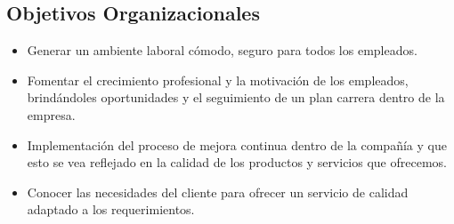 \subsection{Objetivos Organizacionales}
\begin{itemize}
\item Generar un ambiente laboral cómodo, seguro para todos los empleados.
\item Fomentar el crecimiento profesional y la motivación de los empleados, brindándoles oportunidades y el seguimiento de un plan carrera dentro de la empresa. 
\item Implementación del proceso de mejora continua dentro de la compañía y que esto se vea reflejado en la calidad de los productos y servicios que ofrecemos.
\item Conocer las necesidades del cliente para ofrecer un servicio de calidad adaptado a los requerimientos.
\end{itemize}
\newpage